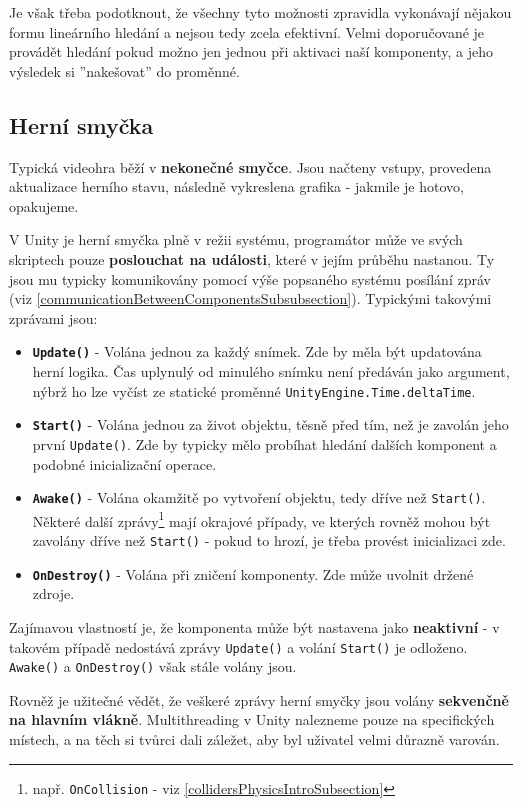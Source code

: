 Je však třeba podotknout, že všechny tyto možnosti zpravidla vykonávají nějakou formu lineárního hledání a nejsou tedy zcela efektivní. Velmi doporučované je provádět hledání pokud možno jen jednou při aktivaci naší komponenty, a jeho výsledek si ''nakešovat'' do proměnné.

\subsection{Herní smyčka}

Typická videohra běží v \textbf{nekonečné smyčce}. Jsou načteny vstupy, provedena aktualizace herního stavu, následně vykreslena grafika - jakmile je hotovo, opakujeme. 

V Unity je herní smyčka plně v režii systému, programátor může ve svých skriptech pouze \textbf{poslouchat na události}, které v jejím průběhu nastanou. Ty jsou mu typicky komunikovány pomocí výše popsaného systému posílání zpráv (viz \ref{communicationBetweenComponentsSubsubsection}).
Typickými takovými zprávami jsou:

\begin{itemize}
    \item \textbf{\texttt{Update()}} - Volána jednou za každý snímek. Zde by měla být updatována herní logika. Čas uplynulý od minulého snímku není předáván jako argument, nýbrž ho lze vyčíst ze statické proměnné \texttt{UnityEngine.Time.deltaTime}.
    \item \textbf{\texttt{Start()}} - Volána jednou za život objektu, těsně před tím, než je zavolán jeho první \texttt{Update()}. Zde by typicky mělo probíhat hledání dalších komponent a podobné inicializační operace.
    \item \textbf{\texttt{Awake()}} - Volána okamžitě po vytvoření objektu, tedy dříve než \texttt{Start()}. Některé další zprávy\footnote{např. \texttt{OnCollision} - viz \ref{collidersPhysicsIntroSubsection}} mají okrajové případy, ve kterých rovněž mohou být zavolány dříve než \texttt{Start()} - pokud to hrozí, je třeba provést inicializaci zde.
    \item \textbf{\texttt{OnDestroy()}} - Volána při zničení komponenty. Zde může uvolnit držené zdroje.
\end{itemize}
Zajímavou vlastností je, že komponenta může být nastavena jako \textbf{neaktivní} - v takovém případě nedostává zprávy \texttt{Update()} a volání \texttt{Start()} je odloženo. \texttt{Awake()} a \texttt{OnDestroy()} však stále volány jsou.

Rovněž je užitečné vědět, že veškeré zprávy herní smyčky jsou volány \textbf{sekvenčně na hlavním vlákně}. Multithreading v Unity nalezneme pouze na specifických místech, a na těch si tvůrci dali záležet, aby byl uživatel velmi důrazně varován.

